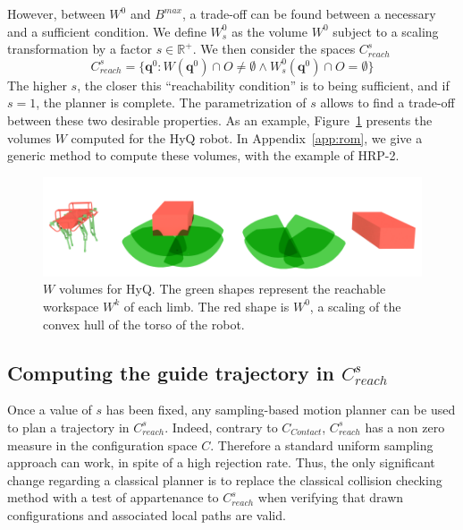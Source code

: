 However, between $W^0$ and $B^{max}$, a trade-off can be found between a necessary and a sufficient condition. We define $W^0_s$ as the volume $W^0$ subject to a scaling transformation by a factor $s \in \mathbb{R}^+$. 
%
We then consider the spaces $C_{reach}^s$
 \begin{equation}
C_{reach}^s = \{ \mathbf{q}^0 : W(\mathbf{q}^{0}) \cap O \neq \emptyset \wedge W^0_s(\mathbf{q}^{0}) \cap O = \emptyset \} %
\end{equation}
%
The higher $s$, the closer this ``reachability condition'' is to being sufficient, and if $s=1$, the planner is complete. The parametrization of $s$ allows to find a trade-off between these two desirable properties.
As an example, Figure~\ref{fig:hyq_roms} presents the volumes $W$ computed for the HyQ robot.
In Appendix~\ref{app:rom}, we give a generic method to compute these volumes, with the example of HRP-2.

\begin{figure}
  \centering
  \includegraphics[width=0.95\linewidth]{figures/hyq_roms}
  \caption{
           $W$ volumes for HyQ. The green shapes represent the reachable workspace $W^k$ of each limb. The red shape is $W^0$, a scaling of the convex hull
           of the torso of the robot.}
		   \label{fig:hyq_roms}
\end{figure}

\subsection{Computing the guide trajectory in $C_{reach}^s$}
Once a value of $s$ has been fixed, any sampling-based motion planner can be used to plan a trajectory in $C_{reach}^s$. 
Indeed, contrary to $C_{Contact}$,  $C_{reach}^s$ has a non zero measure in the configuration space $C$. Therefore a standard uniform sampling approach
can work, in spite of a high rejection rate. 
Thus, the only significant change regarding a classical planner is to replace the classical collision checking method with a test of appartenance to $C_{reach}^s$ when verifying
that drawn configurations and associated local paths are valid.

